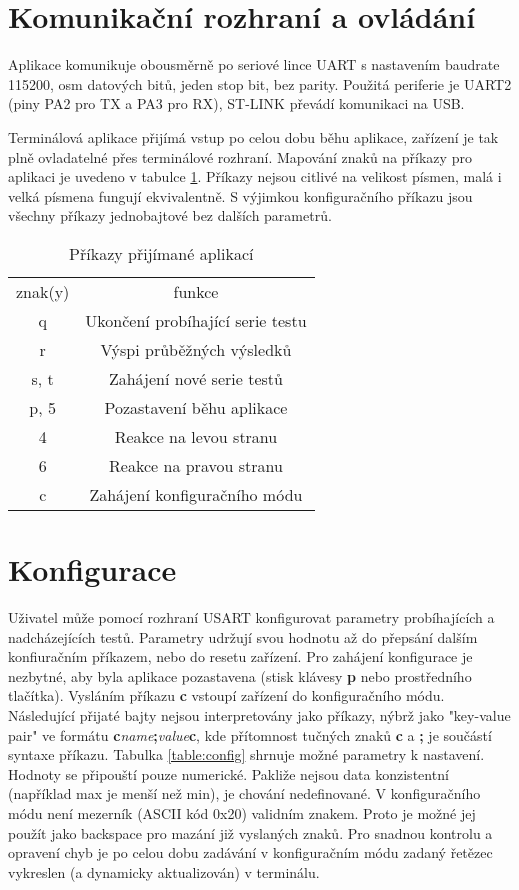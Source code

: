 \documentclass[twoside]{article}
\begin{document}
\section{Komunikační rozhraní a ovládání}

Aplikace komunikuje obousměrně po seriové lince UART s nastavením baudrate 115200,
osm datových bitů, jeden stop bit, bez parity. Použitá periferie je UART2 (piny PA2 pro TX a PA3 pro RX),
ST-LINK převádí komunikaci na USB.

Terminálová aplikace přijímá vstup po celou dobu běhu aplikace, zařízení je tak plně ovladatelné přes terminálové rozhraní.
Mapování znaků na příkazy pro aplikaci je uvedeno v tabulce \ref{table:commands}.
Příkazy nejsou citlivé na velikost písmen, malá i velká písmena fungují ekvivalentně.
S výjimkou konfiguračního příkazu jsou všechny příkazy jednobajtové bez dalších parametrů.

\begin{table}[htbp]
    \centering
    \begin{tabular}{c|c}
        znak(y) & funkce \\
        q & Ukončení probíhající serie testu \\
        r & Výspi průběžných výsledků \\
        s, t & Zahájení nové serie testů \\
        p, 5 & Pozastavení běhu aplikace \\
        4 & Reakce na levou stranu \\
        6 & Reakce na pravou stranu \\
        c & Zahájení konfiguračního módu
    \end{tabular}
    \caption{Příkazy přijímané aplikací}
    \label{table:commands}
\end{table}

\section{Konfigurace}

Uživatel může pomocí rozhraní USART konfigurovat parametry probíhajících a nadcházejících testů.
Parametry udržují svou hodnotu až do přepsání dalším konfiuračním příkazem, nebo do resetu zařízení.
Pro zahájení konfigurace je nezbytné, aby byla aplikace pozastavena (stisk klávesy \textbf{p} nebo prostředního tlačítka).
Vysláním příkazu \textbf{c} vstoupí zařízení do konfiguračního módu. Následující přijaté bajty nejsou interpretovány jako
příkazy, nýbrž jako "key-value pair" ve formátu \textbf{c}\textit{name}\textbf{;}\textit{value}\textbf{c}, kde
přítomnost tučných znaků \textbf{c} a \textbf{;} je součástí syntaxe příkazu.
Tabulka \ref{table:config} shrnuje možné parametry k nastavení.
Hodnoty se připouští pouze numerické. Pakliže nejsou data konzistentní (například max je menší než min), je chování nedefinované.
V konfiguračního módu není mezerník (ASCII kód 0x20) validním znakem. Proto je možné jej použít jako backspace pro mazání již
vyslaných znaků. Pro snadnou kontrolu a opravení chyb je po celou dobu zadávání v konfiguračním módu zadaný řetězec vykreslen
 (a dynamicky aktualizován) v terminálu.
\end{document}
